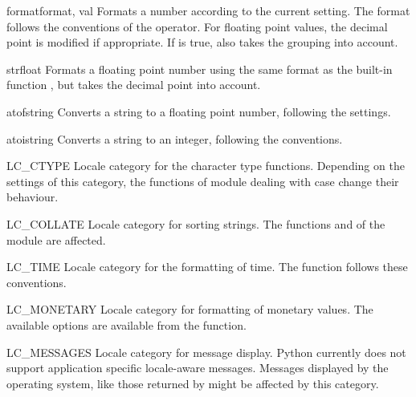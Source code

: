 \begin{funcdesc}{format}{format, val}
  Formats a number  according to the current
   setting.  The format follows the conventions
  of the \code{\%} operator.  For floating point values, the decimal
  point is modified if appropriate.  If  is true, also
  takes the grouping into account.
\end{funcdesc}

\begin{funcdesc}{str}{float}
  Formats a floating point number using the same format as the
  built-in function , but takes the decimal
  point into account.
\end{funcdesc}

\begin{funcdesc}{atof}{string}
  Converts a string to a floating point number, following the
   settings.
\end{funcdesc}

\begin{funcdesc}{atoi}{string}
  Converts a string to an integer, following the
   conventions.
\end{funcdesc}

\begin{datadesc}{LC_CTYPE}
  Locale category for the character type functions.  Depending on the
  settings of this category, the functions of module
   dealing with case change their behaviour.
\end{datadesc}

\begin{datadesc}{LC_COLLATE}
  Locale category for sorting strings.  The functions
   and  of the
   module are affected.
\end{datadesc}

\begin{datadesc}{LC_TIME}
  Locale category for the formatting of time.  The function
   follows these conventions.
\end{datadesc}

\begin{datadesc}{LC_MONETARY}
  Locale category for formatting of monetary values.  The available
  options are available from the  function.
\end{datadesc}

\begin{datadesc}{LC_MESSAGES}
  Locale category for message display. Python currently does not
  support application specific locale-aware messages.  Messages
  displayed by the operating system, like those returned by
   might be affected by this category.
\end{datadesc}


